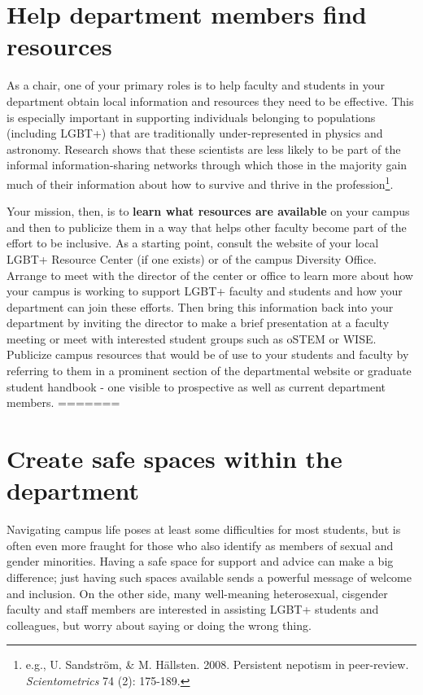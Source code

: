 \section {Help department members find resources}
\label{find-resources}
As a chair, one of your primary roles is to help faculty and students in your department obtain local information and resources they need to be effective. This is especially important in supporting individuals belonging to populations (including LGBT+) that are traditionally under-represented in physics and astronomy. Research shows that these scientists are less likely to be part of the informal information-sharing networks through which those in the majority gain much of their information about how to survive and thrive in the profession\footnote{e.g., U. Sandstr\"{o}m, \& M. H\"{a}llsten. 2008. Persistent nepotism in peer-review. \emph{Scientometrics}\/ 74 (2): 175-189.}.

Your mission, then, is to \textbf{learn what resources are available} on your campus and then to publicize them in a way that helps other faculty become part of the effort to be inclusive. As a starting point, consult the website of your local LGBT+ Resource Center (if one exists) or of the campus Diversity Office. Arrange to meet with the director of the center or office to learn more about how your campus is working to support LGBT+ faculty and students and how your department can join these efforts. Then bring this information back into your department by inviting the director to make a brief presentation at a faculty meeting or meet with interested student groups such as oSTEM or WISE. Publicize campus resources that would be of use to your students and faculty by referring to them in a prominent section of the departmental website or graduate student handbook - one visible to prospective as well as current department members.
=======
\section {Create safe spaces within the department}
\label{safe-spaces}
Navigating campus life poses at least some difficulties for most students, but is often even more fraught for those who also identify as members of sexual and gender minorities. Having a safe space for support and advice can make a big difference; just having such spaces available sends a powerful message of welcome and inclusion. On the other side, many well-meaning heterosexual, cisgender faculty and staff members are interested in assisting LGBT+ students and colleagues, but worry about saying or doing the wrong thing.

